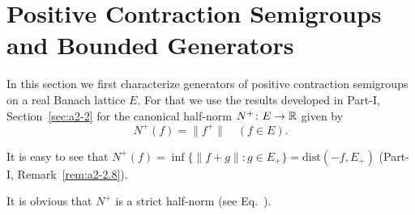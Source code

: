 \section{Positive Contraction Semigroups and Bounded Generators}\label{sec:c2-1}%
In this section we first characterize generators of positive contraction semigroups on a real Banach lattice $E$.
For that we use the results developed in Part-I, Section~\ref{sec:a2-2} for the canonical half-norm $N^{+} \colon E \to \mathbb{R}$ given by
\begin{equation}\label{eq:c2-1.1}
N^{+}(f) = \|f^{+}\| \quad (f \in E).
\end{equation}
\begin{remark*}\label{rem:c2-1.1}
%
It is easy to see that $N^{+}(f) = \inf \{\|f+g\| \colon g \in E_{+}\} = \text{dist}(-f,E_{+})$ (\cf Part-I, Remark~\ref{rem:a2-2.8}). 
\end{remark*}
It is obvious that $N^{+}$ is a strict half-norm (see Eq.~). 

